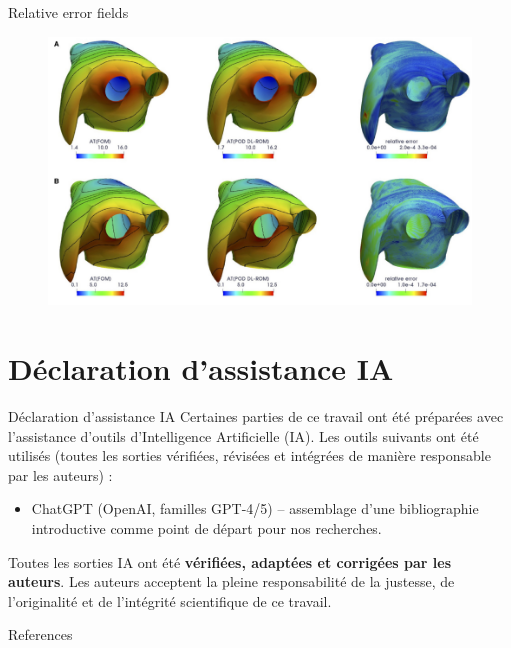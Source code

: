 \documentclass{beamer}
\begin{document}
\begin{frame}{Relative error fields}
  
  \begin{figure}
      \centering
      \includegraphics[width=0.7\linewidth]{images/err-fields.png}
      \caption{\textcite{Fresca2021}}
  \end{figure}

\end{frame}

\section*{Déclaration d'assistance IA}
\begin{frame}{Déclaration d'assistance IA}
  Certaines parties de ce travail ont été préparées avec l'assistance d'outils d'Intelligence Artificielle (IA). Les outils suivants ont été utilisés (toutes les sorties vérifiées, révisées et intégrées de manière responsable par les auteurs) :
  \begin{itemize}
    \item ChatGPT (OpenAI, familles GPT-4/5) – assemblage d'une bibliographie introductive comme point de départ pour nos recherches.
  \end{itemize}
  Toutes les sorties IA ont été \textbf{vérifiées, adaptées et corrigées par les auteurs}. Les auteurs acceptent la pleine responsabilité de la justesse, de l'originalité et de l'intégrité scientifique de ce travail.
\end{frame}

\begin{frame}[allowframebreaks]{References}
    \printbibliography
\end{frame}
\end{document}
